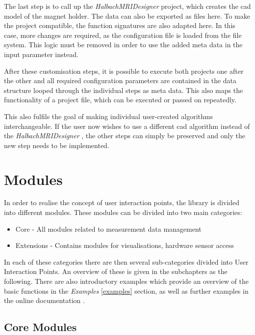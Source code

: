 The last step is to call up the \emph{HalbachMRIDesigner}
\cite{HalbachMRIDesigner} project, which creates the \gls{cad} model
of the magnet holder. The data can also be exported as files here. To
make the project compatible, the function signatures are also adapted
here. In this case, more changes are required, as the configuration file
is loaded from the file system. This logic must be removed in order to
use the added meta data in the input parameter instead.

After these customisation steps, it is possible to execute both projects
one after the other and all required configuration parameters are
contained in the data structure looped through the individual steps as
meta data. This also maps the functionality of a project file, which can
be executed or passed on repeatedly.

This also fulfils the goal of making individual user-created algorithms
interchangeable. If the user now wishes to use a different \gls{cad}
algorithm instead of the \emph{HalbachMRIDesigner}
\cite{HalbachMRIDesigner}, the other steps can simply be preserved
and only the new step needs to be implemented.

\hypertarget{modules}{%
\section{Modules}\label{modules}}

In order to realise the concept of user interaction points, the library
is divided into different modules. These modules can be divided into two
main categories:

\begin{itemize}
\tightlist
\item
  Core - All modules related to measurement data management
\item
  Extensions - Contains modules for visualisations, hardware sensor
  access
\end{itemize}

In each of these categories there are then several sub-categories
divided into User Interaction Points. An overview of these is given in
the subchapters as the following. There are also introductory examples
which provide an overview of the basic functions in the \emph{Examples}
\ref{examples} section, as well as further examples in the online
documentation \cite{MagneticReadoutProcessingReadTheDocs}.

\hypertarget{core-modules}{%
\subsection{Core Modules}\label{core-modules}}

